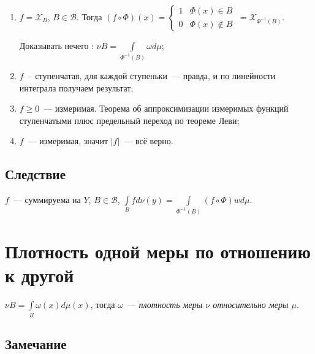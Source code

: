 \documentclass{article}
\begin{document}
            \begin{enumerate}
            
                \item $f = \mathcal{X}_B$, $B \in \mathcal{B}$. Тогда $\left(f \circ \Phi \right)(x) = \begin{cases} 1 & \Phi(x) \in B \\ 0 & \Phi(x) \notin B \end{cases} \ = \mathcal{X}_{\Phi^{-1}(B)}$.
                
                    Доказывать нечего \smiley{} : $\nu B = \int\limits_{\Phi^{-1}(B)} \omega d \mu$;
                    
                \item $f$~-- ступенчатая, для каждой ступеньки~--- правда, и по линейности интеграла получаем результат;
                
                \item $f \geqslant 0$~--- измеримая. Теорема об аппроксимизации измеримых функций ступенчатыми плюс предельный переход по теореме Леви;
                
                \item $f$~--- измеримая, значит $|f|$~--- всё верно.
                
            \end{enumerate}
            
        \subsection{Следствие}
        
            $f$~--- суммируема на $Y$, $B \in \mathcal{B}$, $\int\limits_B f d \nu(y) = \int\limits_{\Phi^{-1}(B)} \left(f \circ \Phi\right) w d \mu$.
            
    \newpage
    
    \section{Плотность одной меры по отношению к другой}
    
        $\nu B = \int\limits_B \omega(x) d \mu(x)$, тогда $\omega$~--- \textit{плотность меры $\nu$ относительно меры $\mu$}.
            
        \subsection{Замечание}
        
\end{document}
